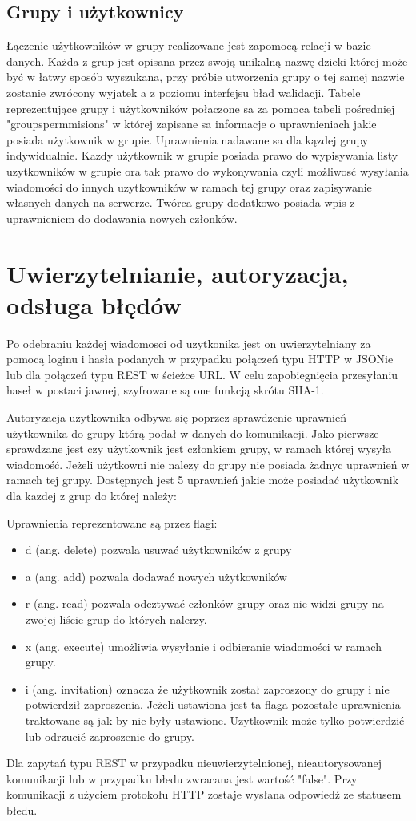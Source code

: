 \documentclass[11pt,a4paper,polish,thesis]{dcsbook}
\begin{document}
\subsection{Grupy i użytkownicy}

Łączenie użytkowników w grupy realizowane jest zapomocą relacji w bazie danych. 
Każda z grup jest opisana przez swoją unikalną nazwę dzieki której może być w łatwy sposób wyszukana, przy próbie utworzenia grupy o tej samej nazwie zostanie zwrócony wyjatek a z poziomu interfejsu bład walidacji.
Tabele reprezentujące grupy i użytkowników połaczone sa za pomoca tabeli pośredniej "groupspermmisions" w której zapisane sa informacje o uprawnieniach jakie posiada użytkownik w grupie. 
Uprawnienia nadawane sa dla kązdej grupy indywidualnie. 
Kazdy użytkownik w grupie posiada prawo do wypisywania listy uzytkowników w grupie ora tak prawo do wykonywania czyli możliwosć wysyłania wiadomości do innych uzytkowników w ramach tej grupy oraz zapisywanie własnych danych na serwerze.
Twórca grupy dodatkowo posiada wpis z uprawnieniem do dodawania nowych członków. 

\section{Uwierzytelnianie, autoryzacja, odsługa błędów} 
Po odebraniu każdej wiadomosci od uzytkonika jest on uwierzytelniany za pomocą loginu i hasła podanych w przypadku połączeń typu HTTP w JSONie lub dla połączeń typu REST w ścieżce URL.
W celu zapobiegnięcia przesyłaniu haseł w postaci jawnej, szyfrowane są one funkcją skrótu SHA-1.

Autoryzacja użytkownika odbywa się poprzez sprawdzenie uprawnień użytkownika do grupy którą podał w danych do komunikacji. 
Jako pierwsze sprawdzane jest czy użytkownik jest członkiem grupy, w ramach której wysyła wiadomość. 
Jeżeli użytkowni nie nalezy do grupy nie posiada żadnyc uprawnień w ramach tej grupy.
Dostępnych jest 5 uprawnień jakie może posiadać użytkownik dla kazdej z grup do której należy:

Uprawnienia reprezentowane są przez flagi:
\begin{itemize}
\item d (ang. delete) pozwala usuwać użytkowników z grupy
\item a (ang. add) pozwala dodawać nowych użytkowników
\item r (ang. read) pozwala odcztywać członków grupy oraz nie widzi grupy na zwojej liście grup do których nalerzy.
\item x (ang. execute) umożliwia wysyłanie i odbieranie wiadomości w ramach grupy.
\item i (ang. invitation) oznacza że użytkownik został zaproszony do grupy i nie potwierdził zaproszenia. Jeżeli ustawiona jest ta flaga pozostałe uprawnienia traktowane są jak by nie były ustawione. Uzytkownik może tylko potwierdzić lub odrzucić zaproszenie do grupy.
\end{itemize}
Dla zapytań typu REST w przypadku nieuwierzytelnionej, nieautorysowanej komunikacji lub w przypadku błedu zwracana jest wartość "false".
Przy komunikacji z użyciem protokołu HTTP zostaje wysłana odpowiedź ze statusem błedu.
\end{document}
